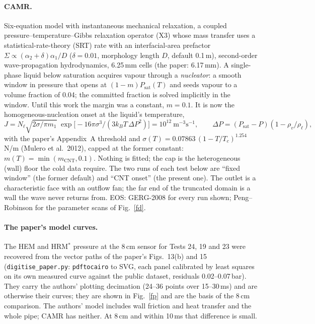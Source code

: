 \documentclass[11pt,a4paper]{article}
\begin{document}
\paragraph{CAMR.} Six-equation model with instantaneous mechanical relaxation, a coupled pressure--temperature--Gibbs relaxation operator (X3) whose mass transfer uses a statistical-rate-theory (SRT) rate with an interfacial-area prefactor $\Sigma \propto (\alpha_2+\delta)\alpha_1/D$ ($\delta = 0.01$, morphology length $D$, default 0.1\,m), second-order wave-propagation hydrodynamics, 6.25\,mm cells (the paper: 6.17\,mm). A single-phase liquid below saturation acquires vapour through a \emph{nucleator}: a smooth window in pressure that opens at $(1 - m)P_{\mathrm{sat}}(T)$ and seeds vapour to a volume fraction of 0.04; the committed fraction is solved implicitly in the window. Until this work the margin was a constant, $m = 0.1$. It is now the homogeneous-nucleation onset at the liquid's temperature,
\[ J = N_\ell\sqrt{2\sigma/\pi m_1}\;\exp\!\big[-16\pi\sigma^3/(3k_BT\,\Delta P^2)\big] = 10^{12}\ \mathrm{m^{-3}s^{-1}},\qquad \Delta P = (P_{\mathrm{sat}} - P)(1 - \rho_v/\rho_\ell), \]
with the paper's Appendix~A threshold and $\sigma(T) = 0.07863\,(1 - T/T_c)^{1.254}$\,N/m (Mulero et al.\ 2012), capped at the former constant: $m(T) = \min(m_{\mathrm{CNT}}, 0.1)$. Nothing is fitted; the cap is the heterogeneous (wall) floor the cold data require. The two runs of each test below are ``fixed window'' (the former default) and ``CNT onset'' (the present one). The outlet is a characteristic face with an outflow fan; the far end of the truncated domain is a wall the wave never returns from. EOS: GERG-2008 for every run shown; Peng--Robinson for the parameter scans of Fig.~\ref{fd}.

\paragraph{The paper's model curves.} The HEM and HRM$^*$ pressure at the 8\,cm sensor for Tests 24, 19 and 23 were recovered from the vector paths of the paper's Figs.~13(b) and 15 (\texttt{digitise\_paper.py}: \texttt{pdftocairo} to SVG, each panel calibrated by least squares on its own measured curve against the public dataset, residuals 0.02--0.07\,bar). They carry the authors' plotting decimation (24--36 points over 15--30\,ms) and are otherwise their curves; they are shown in Fig.~\ref{fp} and are the basis of the 8\,cm comparison. The authors' model includes wall friction and heat transfer and the whole pipe; CAMR has neither. At 8\,cm and within 10\,ms that difference is small.
\end{document}
